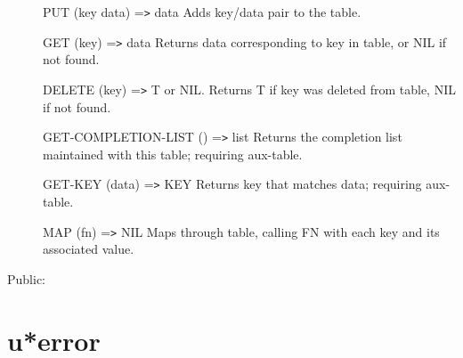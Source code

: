 \begin{description}
  PUT (key data) ={\tt>} data 
    Adds key/data pair to the table.

  GET (key) ={\tt>} data
    Returns data corresponding to key in table, or NIL if not found.

  DELETE (key) ={\tt>} T or NIL.
    Returns T if key was deleted from table, NIL if not found.

  GET-COMPLETION-LIST () ={\tt>} list
   Returns the completion list maintained with this table; requiring
aux-table.

  GET-KEY (data) ={\tt>} KEY
   Returns key that matches data; requiring aux-table. 

  MAP (fn) ={\tt>} NIL
    Maps through table, calling FN with each key and its associated
    value.

\item [Public:]



\end{description}
\horizontalline

\section{u*error}
\label{u*error}

